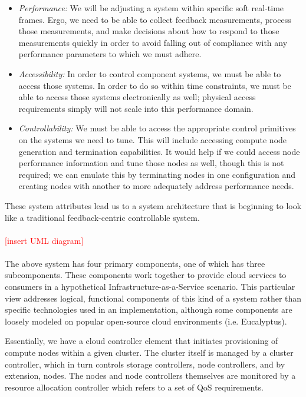 \documentclass[times, 10pt,twocolumn]{article}
\begin{document}
\begin{itemize}
\item \textit{Performance:} We will be adjusting a system within specific soft real-time frames.  Ergo, we need to be able to collect feedback measurements, process those measurements, and make decisions about how to respond to those measurements quickly in order to avoid falling out of compliance with any performance parameters to which we must adhere.
\item \textit{Accessibility:} In order to control component systems, we must be able to access those systems.  In order to do so within time constraints, we must be able to access those systems electronically as well; physical access requirements simply will not scale into this performance domain.
\item \textit{Controllability:} We must be able to access the appropriate control primitives on the systems we need to tune.  This will include accessing compute node generation and termination capabilities.  It would help if we could access node performance information and tune those nodes as well, though this is not required; we can emulate this by terminating nodes in one configuration and creating nodes with another to more adequately address performance needs.
\end{itemize}

These system attributes lead us to a system architecture that is beginning to look like a traditional feedback-centric controllable system.
\\
\\
\textcolor{red}{[insert UML diagram]}
\\
\\
The above system has four primary components, one of which has three subcomponents.  These components work together to provide cloud services to consumers in a hypothetical Infrastructure-as-a-Service scenario.  This particular view addresses logical, functional components of this kind of a system rather than specific technologies used in an implementation, although some components are loosely modeled on popular open-source cloud environments (i.e. Eucalyptus).

Essentially, we have a cloud controller element that initiates provisioning of compute nodes within a given cluster. The cluster itself is managed by a cluster controller, which in turn controls storage controllers, node controllers, and by extension, nodes.  The nodes and node controllers themselves are monitored by a resource allocation controller which refers to a set of QoS requirements.
\end{document}
